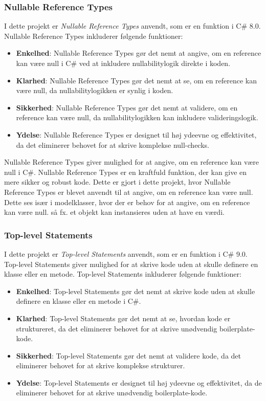 \subsubsection{Nullable Reference Types}
I dette projekt er \emph{Nullable Reference Types} anvendt, som er en funktion i C\# 8.0. Nullable Reference Types inkluderer følgende funktioner:
\begin{itemize}
\item \textbf{Enkelhed}: Nullable Reference Types gør det nemt at angive, om en reference kan være null i C\# ved at inkludere nullabilitylogik direkte i koden.
\item \textbf{Klarhed}: Nullable Reference Types gør det nemt at se, om en reference kan være null, da nullabilitylogikken er synlig i koden.
\item \textbf{Sikkerhed}: Nullable Reference Types gør det nemt at validere, om en reference kan være null, da nullabilitylogikken kan inkludere valideringslogik.
\item \textbf{Ydelse}: Nullable Reference Types er designet til høj ydeevne og effektivitet, da det eliminerer behovet for at skrive komplekse null-checks.
\end{itemize}
Nullable Reference Types giver mulighed for at angive, om en reference kan være null i C\#. Nullable Reference Types er en kraftfuld funktion, der kan give en mere sikker og robust kode. Dette er gjort i dette projekt, hvor Nullable Reference Types er blevet anvendt til at angive, om en reference kan være null.
Dette ses især i modelklasser, hvor der er behov for at angive, om en reference kan være null. så fx. et objekt kan instansieres uden at have en værdi.

\subsubsection{Top-level Statements}
I dette projekt er \emph{Top-level Statements} anvendt, som er en funktion i C\# 9.0. Top-level Statements giver mulighed for at skrive kode uden at skulle definere en klasse eller en metode. Top-level Statements inkluderer følgende funktioner:
\begin{itemize}
\item \textbf{Enkelhed}: Top-level Statements gør det nemt at skrive kode uden at skulle definere en klasse eller en metode i C\#.
\item \textbf{Klarhed}: Top-level Statements gør det nemt at se, hvordan kode er struktureret, da det eliminerer behovet for at skrive unødvendig boilerplate-kode.
\item \textbf{Sikkerhed}: Top-level Statements gør det nemt at validere kode, da det eliminerer behovet for at skrive komplekse strukturer.
\item \textbf{Ydelse}: Top-level Statements er designet til høj ydeevne og effektivitet, da de eliminerer behovet for at skrive unødvendig boilerplate-kode.
\end{itemize}

